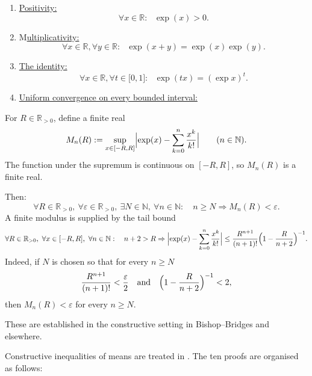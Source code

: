 \documentclass[11pt,reqno]{amsart}
\makeatletter
\providecommand{\R}{\mathbb{R}}
\providecommand{\N}{\mathbb{N}}
\theoremstyle{redplain}
\renewenvironment{quotation}
{\list{}{\listparindent\z@
		\itemindent\z@
		\rightmargin\leftmargin
		\parsep\z@}	\item\relax}
{\endlist}
\numberwithin{equation}{section}
\makeatother
\begin{document}
\begin{enumerate}
\item \underline{Positivity:}\label{Positivity} 
\begin{equation}
\forall x\in \mathbb{R}:\text{ }\exp (x)>0\text{.}
\end{equation}

\item M\underline{ultiplicativity:}\label{Multiplicativity} 
\begin{equation}
\forall x\in \mathbb{R},\forall y\in \mathbb{R}:\text{ }\exp (x+y)=\exp
(x)\exp (y).
\end{equation}

\item \underline{The identity:}\label{identity} 
\begin{equation}
\forall x\in \mathbb{R},\forall t\in \lbrack 0,1]:\text{ }\exp (tx)=(\exp
x)^{t}.
\end{equation}

\item \underline{Uniform convergence on every bounded interval: }
\end{enumerate}

\begin{quotation}
\label{Uniformconvergence}For $R\in \R_{>0}$, define a finite real 
\begin{equation*}
M_{n}(R):=\sup_{x\in [-R,R]}\Bigl|\exp (x)-\sum_{k=0}^{n}\frac{x^{k}}{k!}%
\Bigr|\qquad (n\in \N).
\end{equation*}
The function under the supremum is continuous on $[-R,R]$, so $M_n(R)$ is a
finite real.

Then: 
\begin{equation*}
\forall R\in \R_{>0},\ \forall \varepsilon \in \R_{>0},\ \exists N\in \N,\
\forall n\in \N:\quad n\geq N\Rightarrow M_{n}(R)<\varepsilon .
\end{equation*}%
A finite modulus is supplied by the tail bound 
\begin{equation*}
\forall R\in \R_{>0},\ \forall x\in [-R,R],\ \forall n\in \N:\quad
n+2>R\Rightarrow \Bigl|\exp (x)-\sum_{k=0}^{n}\frac{x^{k}}{k!}\Bigr|\leq 
\frac{R^{n+1}}{(n+1)!}\Bigl(1-\frac{R}{n+2}\Bigr)^{-1}.
\end{equation*}
Indeed, if $N$ is chosen so that for every $n\ge N$ 
\begin{equation*}
\frac{R^{n+1}}{(n+1)!}<\frac{\varepsilon}{2} \quad\text{and}\quad \Bigl(1-%
\frac{R}{n+2}\Bigr)^{-1}<2,
\end{equation*}
then $M_{n}(R)<\varepsilon$ for every $n\ge N$.

\noindent These are established in the constructive setting in
Bishop--Bridges \cite{BishopBridges1985} and elsewhere.

Constructive inequalities of means are treated in \cite{Kawakubo2026}.%
\newline
\noindent The ten proofs are organised as follows:
\end{quotation}
\end{document}
